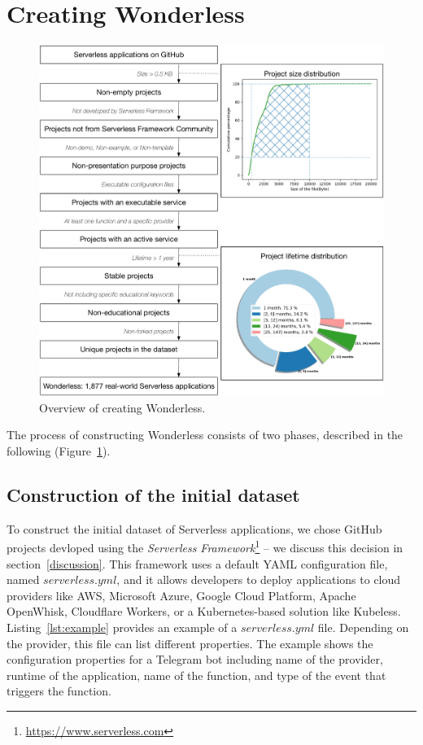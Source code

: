 
\section{Creating Wonderless}
\label{dataset}

\begin{figure}
	\centering
	\includegraphics[scale=0.295]{figures/processOverviewFinalgraffle}
	\caption{Overview of creating Wonderless.}
	\label{fig:overview}
\end{figure}

The  process of constructing Wonderless
consists of two phases, described in the following (Figure~\ref{fig:overview}).

\subsection{Construction of the initial dataset} \label{phaseA}

To construct the initial dataset of Serverless applications, we chose GitHub projects 
devloped using the \emph{Serverless Framework}\footnote{\url{https://www.serverless.com}} 
-- we discuss this decision in section~\ref{discussion}.
This framework uses a default YAML configuration file, named $serverless.yml$, 
and it allows developers to deploy 
applications to cloud providers like AWS, Microsoft Azure, Google Cloud 
Platform, Apache OpenWhisk, Cloudflare Workers, or a Kubernetes-based 
solution like Kubeless. Listing~\ref{lst:example} provides an example of a $serverless.yml$ file. 
Depending on the provider, this file can list different properties.
The example shows the configuration properties for a Telegram bot including 
name of the provider, runtime of the application, name of the function, 
and type of the event that triggers the function. 

